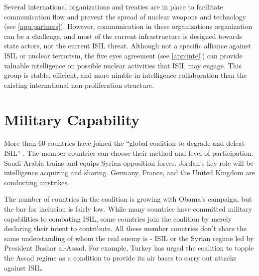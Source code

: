 \documentclass{report}
\begin{document}
Several international organizations and treaties are in place to facilitate communication flow and prevent the spread of nuclear weapons and technology (see \autoref{app:partners}).  However, communication in these organizations organization can be a challenge, and most of the current infrastructure is designed towards state actors, not the current ISIL threat.  Although not a specific alliance against ISIL or nuclear terrorism, the five eyes agreement (see \autoref{app:intel}) can provide valuable intelligence on possible nuclear activities that ISIL may engage. This group is stable, efficient, and more nimble in intelligence collaboration than the existing international non-proliferation structure.  

\section{Military Capability}




More than 60 countries have joined the \enquote{global coalition to degrade and defeat ISIL} \cite{Drennan2014}. The member countries can choose their method and level of participation. Saudi Arabia trains and equips Syrian opposition forces. Jordan's key role will be intelligence acquiring and sharing. Germany, France, and the United Kingdom are conducting airstrikes. 

The number of countries in the coalition is growing with Obama's campaign, but the bar for inclusion is fairly low. While many countries have committed military capabilities to combating ISIL, some countries join the coalition by merely declaring their intent to contribute. All these member countries don't share the same understanding of whom the real enemy is - ISIL or the Syrian regime led by President Bashar al-Assad. For example, Turkey has urged the coalition to topple the Assad regime as a condition to provide its air bases to carry out attacks against ISIL. 
\end{document}

